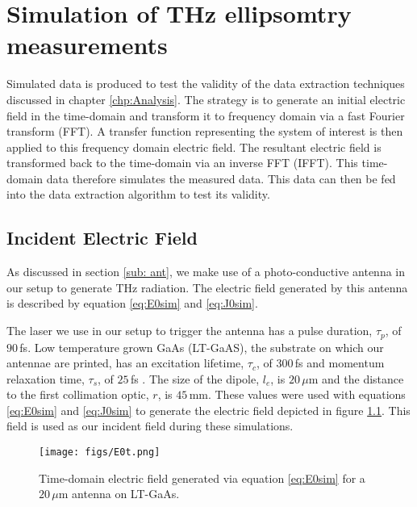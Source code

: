 \chapter{Simulation of THz ellipsomtry measurements}
\label{chp:Simulation}

Simulated data is produced to test the validity of the data extraction techniques discussed in chapter \ref{chp:Analysis}. The strategy is to generate an initial electric field in the time-domain and transform it to frequency domain via a fast Fourier transform (FFT). A transfer function representing the system of interest is then applied to this frequency domain electric field. The resultant electric field is transformed back to the time-domain via an inverse FFT (IFFT). This time-domain data therefore simulates the measured data. This data can then be fed into the data extraction algorithm to test its validity.

\section{Incident Electric Field}
\label{sec:IEF}
As discussed in section \ref{sub: ant}, we make use of a photo-conductive antenna in our setup to generate THz radiation. The electric field generated by this antenna is described by equation \ref{eq:E0sim} and \ref{eq:J0sim}.

The laser we use in our setup to trigger the antenna has a pulse duration, $\tau_{p}$, of $90\,$fs. Low temperature grown GaAs (LT-GaAS), the substrate on which our antennae are printed, has an excitation lifetime, $\tau_{c}$, of $300\,$fs and momentum relaxation time, $\tau_{s}$, of $25\,$fs \cite{Sakai-2005}. The size of the dipole, $l_{e}$, is $20\,\mu$m and the distance to the first collimation optic, $r$, is $45\,$mm. These values were used with equations \ref{eq:E0sim} and \ref{eq:J0sim} to generate the electric field depicted in figure \ref{fig:E0t}. This field is used as our incident field during these simulations.

\begin{figure}[H]
\begin{center}
\texttt{[image: figs/E0t.png]}
\end{center}
\caption[Simulated terahertz electric field in time]{\label{fig:E0t} Time-domain electric field generated via equation \ref{eq:E0sim} for a $20\,\mu$m antenna on LT-GaAs.}
\end{figure}

